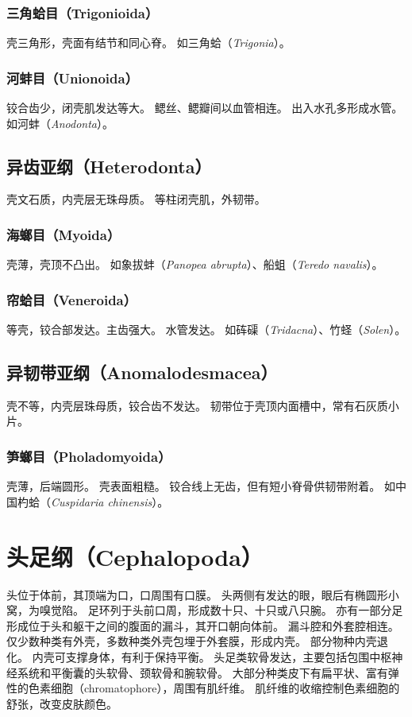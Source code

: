 \documentclass[11pt]{article}
\begin{document}
\subsubsection{三角蛤目（Trigonioida）}
壳三角形，壳面有结节和同心脊。
如三角蛤（\textit{Trigonia}）。

\subsubsection{河蚌目（Unionoida）}
铰合齿少，闭壳肌发达等大。
鳃丝、鳃瓣间以血管相连。
出入水孔多形成水管。
如河蚌（\textit{Anodonta}）。

\subsection{异齿亚纲（Heterodonta）}
壳文石质，内壳层无珠母质。
等柱闭壳肌，外韧带。

\subsubsection{海螂目（Myoida）}
壳薄，壳顶不凸出。
如象拔蚌（\textit{Panopea abrupta}）、船蛆（\textit{Teredo navalis}）。

\subsubsection{帘蛤目（Veneroida）}
等壳，铰合部发达。主齿强大。
水管发达。
如砗磲（\textit{Tridacna}）、竹蛏（\textit{Solen}）。

\subsection{异韧带亚纲（Anomalodesmacea）}
壳不等，内壳层珠母质，铰合齿不发达。
韧带位于壳顶内面槽中，常有石灰质小片。

\subsubsection{笋螂目（Pholadomyoida）}
壳薄，后端圆形。
壳表面粗糙。
铰合线上无齿，但有短小脊骨供韧带附着。
如中国杓蛤（\textit{Cuspidaria chinensis}）。

\section{头足纲（Cephalopoda）}
头位于体前，其顶端为口，口周围有口膜。
头两侧有发达的眼，眼后有椭圆形小窝，为嗅觉陷。
足环列于头前口周，形成数十只、十只或八只腕。
亦有一部分足形成位于头和躯干之间的腹面的漏斗，其开口朝向体前。
漏斗腔和外套腔相连。
仅少数种类有外壳，多数种类外壳包埋于外套膜，形成内壳。
部分物种内壳退化。
内壳可支撑身体，有利于保持平衡。
头足类软骨发达，主要包括包围中枢神经系统和平衡囊的头软骨、颈软骨和腕软骨。
大部分种类皮下有扁平状、富有弹性的色素细胞（chromatophore），周围有肌纤维。
肌纤维的收缩控制色素细胞的舒张，改变皮肤颜色。
\end{document}
